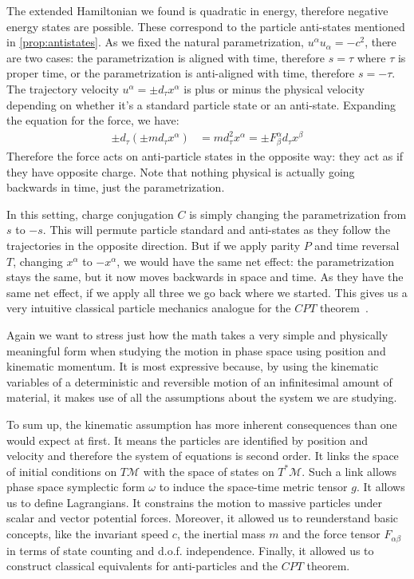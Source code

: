 \documentclass[smallextended]{svjour3}
\numberwithin{equation}{section}
\theoremstyle{definition}
\begin{document}
The extended Hamiltonian we found is quadratic in energy, therefore negative energy states are possible. These correspond to the particle anti-states mentioned in \ref{prop:antistates}. As we fixed the natural parametrization, $u^\alpha u_\alpha = - c^2$, there are two cases: the parametrization is aligned with time, therefore $s=\tau$ where $\tau$ is proper time, or the parametrization is anti-aligned with time, therefore $s=-\tau$. The trajectory velocity $u^\alpha= \pm d_\tau x^\alpha$ is plus or minus the physical velocity depending on whether it's a standard particle state or an anti-state. Expanding the equation for the force, we have:
\begin{align*}
\pm d_\tau (\pm m d_\tau x^\alpha) &= m d_\tau^2 x^\alpha = \pm  F^\alpha_\beta d_\tau x^\beta
\end{align*}
Therefore the force acts on anti-particle states in the opposite way: they act as if they have opposite charge. Note that nothing physical is actually going backwards in time, just the parametrization.

In this setting, charge conjugation $C$ is simply changing the parametrization from $s$ to $-s$. This will permute particle standard and anti-states as they follow the trajectories in the opposite direction. But if we apply parity $P$ and time reversal $T$, changing $x^\alpha$ to $-x^\alpha$, we would have the same net effect: the parametrization stays the same, but it now moves backwards in space and time. As they have the same net effect, if we apply all three we go back where we started. This gives us a very intuitive classical particle mechanics analogue for the $CPT$ theorem~\cite{Weinberg,ClCPT}.

Again we want to stress just how the math takes a very simple and physically meaningful form when studying the motion in phase space using position and kinematic momentum. It is most expressive because, by using the kinematic variables of a deterministic and reversible motion of an infinitesimal amount of material, it makes use of all the assumptions about the system we are studying.

To sum up, the kinematic assumption has more inherent consequences than one would expect at first. It means the particles are identified by position and velocity and therefore the system of equations is second order. It links the space of initial conditions on $T\mathcal{M}$ with the space of states on $T^*\mathcal{M}$. Such a link allows phase space symplectic form $\omega$ to induce the space-time metric tensor $g$. It allows us to define Lagrangians. It constrains the motion to massive particles under scalar and vector potential forces. Moreover, it allowed us to reunderstand basic concepts, like the invariant speed $c$, the inertial mass $m$ and the force tensor $F_{\alpha\beta}$ in terms of state counting and d.o.f. independence. Finally, it allowed us to construct classical equivalents for anti-particles and the $CPT$ theorem.
\end{document}
